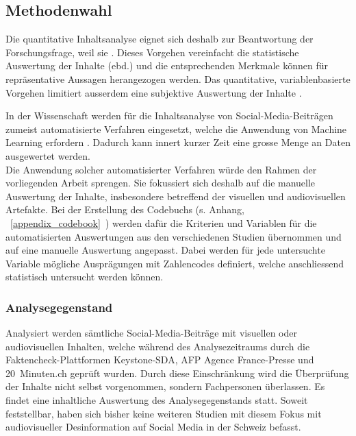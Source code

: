 \documentclass[12pt,a4paper]{article}        %
\begin{document}
\subsection{Methodenwahl}
Die quantitative Inhaltsanalyse eignet sich deshalb zur Beantwortung der Forschungsfrage, weil sie  \parencites[11]{kessler_manuelle_2023}[vgl.\ auch][227]{lobinger_quantitative_2012}. Dieses Vorgehen vereinfacht die statistische Auswertung der Inhalte (ebd.) und die entsprechenden Merkmale können für repräsentative Aussagen herangezogen werden. Das quantitative, variablenbasierte Vorgehen limitiert ausserdem eine subjektive Auswertung der Inhalte \parencite[140]{lai_content_2015}.

In der Wissenschaft werden für die Inhaltsanalyse von Social-Media-Beiträgen zumeist automatisierte Verfahren eingesetzt, welche die Anwendung von Machine Learning erfordern \parencites[vgl.\ bspw.]{andreotta_analyzing_2019}{lai_content_2015}
{schwartz_data-driven_2015}{wilson_content_2022}{wang_video_2015}. Dadurch kann innert kurzer Zeit eine grosse Menge an Daten ausgewertet werden.\\
Die Anwendung solcher automatisierter Verfahren würde den Rahmen der vorliegenden Arbeit sprengen. Sie fokussiert sich deshalb auf die manuelle Auswertung der Inhalte, insbesondere betreffend der visuellen und audiovisuellen Artefakte. Bei der Erstellung des Codebuchs (s. Anhang, ~\ref{appendix_codebook}~) werden dafür die Kriterien und Variablen für die automatisierten Auswertungen aus den verschiedenen Studien übernommen und auf eine manuelle Auswertung angepasst. Dabei werden für jede untersuchte Variable mögliche Ausprägungen mit Zahlencodes definiert, welche anschliessend statistisch untersucht werden können.

\subsubsection{Analysegegenstand}
Analysiert werden sämtliche Social-Media-Beiträge mit visuellen oder audiovisuellen Inhalten, welche während des Analysezeitraums durch die Faktencheck-Plattformen Keystone-SDA, AFP Agence France-Presse und 20 Minuten.ch geprüft wurden. Durch diese Einschränkung wird die Überprüfung der Inhalte nicht selbst vorgenommen, sondern Fachpersonen überlassen. Es findet eine inhaltliche Auswertung des Analysegegenstands statt. Soweit feststellbar, haben sich bisher keine weiteren Studien mit diesem Fokus mit audiovisueller Desinformation auf Social Media in der Schweiz befasst.
\end{document}
